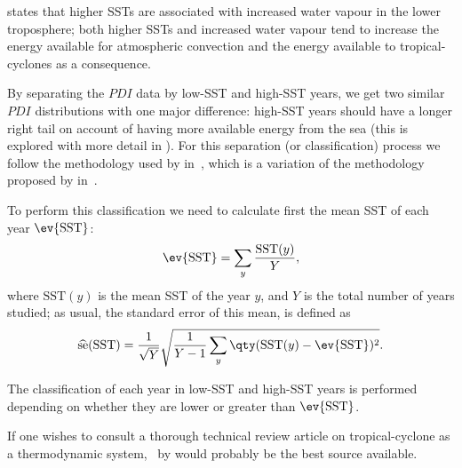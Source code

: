 \citeauthor{Trenberth2005} states that higher SSTs are associated with increased water vapour in the lower troposphere; both higher SSTs and increased water vapour tend to increase the energy available for atmospheric convection and the energy available to tropical-cyclones as a consequence.

By separating the $PDI$ data by low-SST and high-SST years, we get two similar $PDI$ distributions with one major difference: high-SST years should have a longer right tail on account of having more available energy from the sea (this is explored with more detail in ). For this separation (or classification) process we follow the methodology used by \citeauthor{Corral2010} in~\cite{Corral2010}, which is a variation of the methodology proposed by \citeauthor{Webster2005} in~\cite{Webster2005}.

\sk
To perform this classification we need to calculate first the mean SST of each year $\ev{\text{SST}}$:
\begin{align}
	\ev{\text{SST}} = \sum_{y} \frac{\text{SST}(y)}{Y},
\end{align}
where $\text{SST}(y)$ is the mean SST of the year $y$, and $Y$ is the total number of years studied; as usual, the standard error of this mean, is defined as
\begin{align}\label{eq:sst-sem}
	\se{\text{SST}} = \frac{1}{\sqrt{Y}} \sqrt{ \frac{1}{Y-1} \sum_{y} \qty(\text{SST}(y) - \ev{\text{SST}})^{2} } .
\end{align}

The classification of each year in low-SST and high-SST years is performed depending on whether they are lower or greater than $\ev{\text{SST}}$.

\medskip
If one wishes to consult a thorough technical review article on tropical-cyclone as a thermodynamic system,~\cite{Emanuel2003} by \citeauthor{Emanuel2003} would probably be the best source available.



